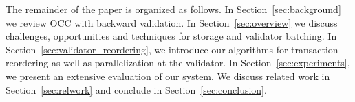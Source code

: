 The remainder of the paper is organized as follows. In Section~\ref{sec:background}  we review OCC with backward validation. In Section~\ref{sec:overview} we discuss challenges, opportunities and techniques for storage and validator batching. In Section~\ref{sec:validator_reordering}, we introduce our algorithms for transaction reordering as well as parallelization at the validator. In Section~\ref{sec:experiments}, we present an extensive evaluation of our system. We discuss related work in Section~\ref{sec:relwork} and conclude in Section~\ref{sec:conclusion}.

